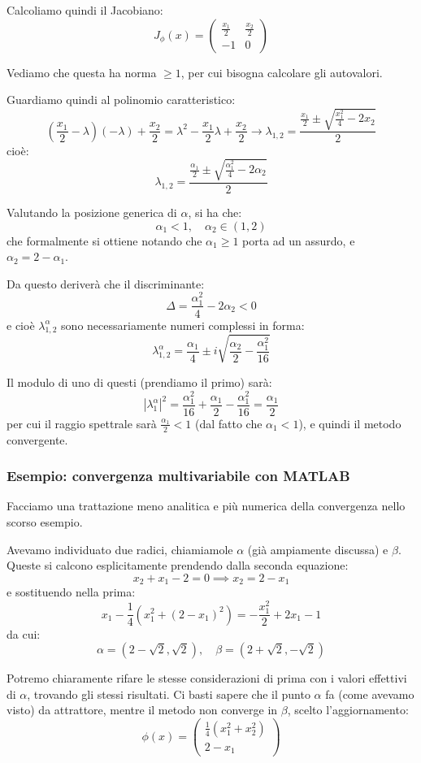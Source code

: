 \documentclass[a4paper,11pt]{article}
\begin{document}
Calcoliamo quindi il Jacobiano:
$$
J_\phi(x) =
\begin{pmatrix}
	\frac{x_1}{2} & \frac{x_2}{2} \\
	-1 & 0
\end{pmatrix}
$$

Vediamo che questa ha norma $\geq 1$, per cui bisogna calcolare gli autovalori.

Guardiamo quindi al polinomio caratteristico:
$$
\left(\frac{x_1}{2} - \lambda\right) \left(-\lambda\right) + \frac{x_2}{2} = \lambda^2 - \frac{x_1}{2} \lambda + \frac{x_2}{2} \rightarrow \lambda_{1, 2} = \frac{\frac{x_1}{2} \pm \sqrt{\frac{x_1^2}{4} - 2 x_2}}{2}
$$
cioè:
$$
\lambda_{1, 2} = \frac{\frac{\alpha_1}{2} \pm \sqrt{\frac{\alpha_1^2}{4} - 2 \alpha_2}}{2}
$$

Valutando la posizione generica di $\alpha$, si ha che:
$$
\alpha_1 < 1, \quad \alpha_2 \in (1, 2)
$$
che formalmente si ottiene notando che $\alpha_1 \geq 1$ porta ad un assurdo, e $\alpha_2 = 2 - \alpha_1$.

Da questo deriverà che il discriminante:
$$
\Delta = \frac{\alpha_1^2}{4} - 2 \alpha_2 < 0
$$
e cioè $\lambda_{1, 2}^\alpha$ sono necessariamente numeri complessi in forma:
$$
\lambda_{1, 2}^\alpha = \frac{\alpha_1}{4} \pm i \sqrt{ \frac{\alpha_2}{2} - \frac{\alpha_1^2}{16} }
$$

Il modulo di uno di questi (prendiamo il primo) sarà:
$$
|\lambda_1^\alpha|^2 = \frac{\alpha_1^2}{16} + \frac{\alpha_1}{2} - \frac{\alpha_1^2}{16} = \frac{\alpha_1}{2}
$$
per cui il raggio spettrale sarà $\frac{\alpha_1}{2} < 1$ (dal fatto che $\alpha_1 < 1$), e quindi il metodo convergente.

\subsubsection{Esempio: convergenza multivariabile con MATLAB}
Facciamo una trattazione meno analitica e più numerica della convergenza nello scorso esempio.

Avevamo individuato due radici, chiamiamole $\alpha$ (già ampiamente discussa) e $\beta$.
Queste si calcono esplicitamente prendendo dalla seconda equazione:
$$
x_2 + x_1 - 2 = 0 \implies x_2 = 2 - x_1
$$
e sostituendo nella prima:
$$
x_1 - \frac{1}{4} (x_1^2 + (2 - x_1)^2) = -\frac{x_1^2}{2} + 2 x_1 - 1
$$
da cui:
$$
\alpha = (2 - \sqrt{2}, \sqrt{2}), \quad \beta = (2 + \sqrt{2}, - \sqrt{2})
$$

Potremo chiaramente rifare le stesse considerazioni di prima con i valori effettivi di $\alpha$, trovando gli stessi risultati.
Ci basti sapere che il punto $\alpha$ fa (come avevamo visto) da attrattore, mentre il metodo non converge in $\beta$, scelto l'aggiornamento:
$$
\phi(x) =
\begin{pmatrix}
	\frac{1}{4} (x_1^2 + x_2^2) \\
	2 - x_1
\end{pmatrix}
$$
\end{document}
